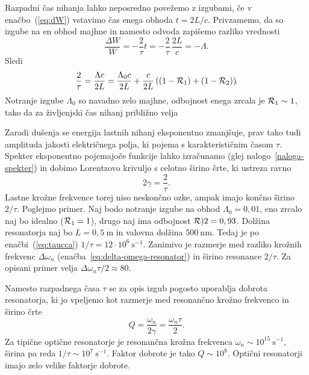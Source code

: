 Razpadni čas nihanja lahko neposredno povežemo z izgubami, če v enačbo~(\ref{eq:dW})
vstavimo čas enega obhoda $t=2L/c$. Privzamemo, da so izgube na en obhod majhne in namesto 
odvoda zapišemo razliko vrednosti
\begin{equation}
\frac{\Delta W}{W}= -\frac{2}{\tau} t = -\frac{2}{\tau}\, \frac{2L}{c} = -\Lambda.
\end{equation}
Sledi
\begin{equation}
\frac{2}{\tau}=\frac{\Lambda c}{2L}=\frac{\Lambda_0c}{2L}+\frac{c}{2L}\left((1-{\cal R}_{1})
+(1-{\cal R}_{2})\right)\!\!.
\label{taulambda}
\end{equation}
Notranje izgube $\Lambda_0$ so navadno zelo majhne, 
odbojnost enega zrcala je ${\cal R}_{1} \sim 1$, tako da za življenjski čas 
nihanj približno velja

Zaradi dušenja se energija lastnih nihanj eksponentno zmanjšuje, prav tako tudi
amplituda jakosti električnega polja, ki pojema s karakterističnim časom $\tau$. 
Spekter eksponentno pojemajoče funkcije lahko izračunamo
(glej nalogo~\ref{naloga-spekter}) in dobimo Lorentzovo krivuljo 
s celotno širino črte, ki ustreza ravno
\begin{equation}
2\gamma=\frac{2}{\tau}.
\label{3.26}
\end{equation}
Lastne krožne frekvence torej niso neskončno ozke, ampak imajo končno širino $2/\tau$.
Poglejmo primer. Naj bodo notranje izgube na obhod $\Lambda_0=0,01$,
eno zrcalo naj bo idealno (${\cal R}_1=1$), drugo naj ima odbojnost ${\cal R})2=0,93$. Dolžina
resonatorja naj bo $L=0,5~\si{\metre}$ in valovna dolžina $500~\si{\nano\metre}$. Tedaj
je po enačbi~(\ref{eq:taucca}) $1/\tau=12\cdot10^{6}~\si{\second}^{-1}$. Zanimivo je razmerje med 
razliko krožnih frekvenc $\Delta \omega_n$ 
(enačba~\ref{eq:delta-omega-resonator}) in širino resonance $2/\tau$. 
Za opisani primer velja $\Delta\omega_n\tau/2 \approx 80$.

\begin{remark}
Namesto razpadnega časa $\tau$ se za opis izgub pogosto uporablja
dobrota resonatorja, ki jo vpeljemo kot
razmerje med resonančno krožno frekvenco in širino črte 
\begin{equation}
Q=\frac{\omega_{n}}{2\gamma} = \frac{\omega_{n}\tau}{2}.
\end{equation}
Za tipične optične resonatorje je resonančna krožna
frekvenca $\omega_n \sim 10^{15}~\si{\second}^{-1}$, širina pa reda 
 $1/\tau \sim 10^{7}~\si{\second}^{-1}$. Faktor dobrote je tako $Q \sim 10^{8}$. Optični 
 resonatorji imajo zelo velike faktorje dobrote.
\end{remark}

